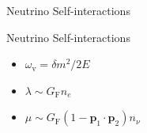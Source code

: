 \documentclass[9pt]{beamer}
\begin{document}
\begin{darkframes}
\begin{frame}{Neutrino Self-interactions}
\begin{tcolorbox}
{   }
\end{tcolorbox}




\end{frame}



\begin{frame}{Neutrino Self-interactions}


   \begin{tcolorbox}[title=Characteristic Length Scales]

      \begin{itemize}
         \item \color{black} $\omega_{\mathrm v} = \delta m^2/2E $
         \item \color{black} $\lambda \sim G_{\mathrm F} n_e$
         \item \color{black} $\mu \sim G_{\mathrm F} (1-\mathbf p_1 \cdot \mathbf p_2) n_{\nu} $
      \end{itemize}


\end{tcolorbox}
\end{frame}
\end{darkframes}
\end{document}
